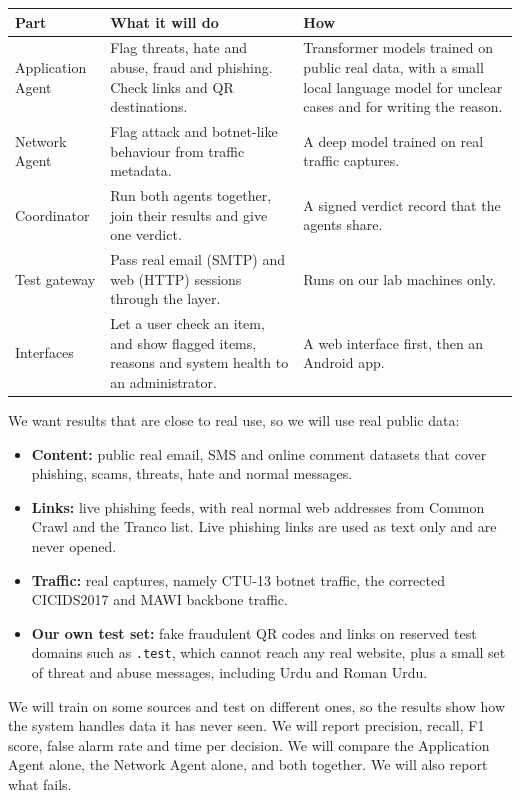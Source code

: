\documentclass[10.5pt,a4paper]{article}
\newcommand{\head}[1]{\vspace{5pt}{\large\bfseries #1}\par\vspace{1pt}}
\begin{document}
\head{3. What the prototype will include}
\begin{tabularx}{\linewidth}{@{}P{3cm}YP{5.6cm}@{}}
\toprule
\textbf{Part} & \textbf{What it will do} & \textbf{How} \\
\midrule
Application Agent & Flag threats, hate and abuse, fraud and phishing. Check links and QR destinations. & Transformer models trained on public real data, with a small local language model for unclear cases and for writing the reason. \\
Network Agent & Flag attack and botnet-like behaviour from traffic metadata. & A deep model trained on real traffic captures. \\
Coordinator & Run both agents together, join their results and give one verdict. & A signed verdict record that the agents share. \\
Test gateway & Pass real email (SMTP) and web (HTTP) sessions through the layer. & Runs on our lab machines only. \\
Interfaces & Let a user check an item, and show flagged items, reasons and system health to an administrator. & A web interface first, then an Android app. \\
\bottomrule
\end{tabularx}

\newpage
\head{4. Data and testing}
We want results that are close to real use, so we will use real public data:

\begin{itemize}
  \item \textbf{Content:} public real email, SMS and online comment datasets that cover phishing, scams, threats, hate and normal messages.
  \item \textbf{Links:} live phishing feeds, with real normal web addresses from Common Crawl and the Tranco list. Live phishing links are used as text only and are never opened.
  \item \textbf{Traffic:} real captures, namely CTU-13 botnet traffic, the corrected CICIDS2017 and MAWI backbone traffic.
  \item \textbf{Our own test set:} fake fraudulent QR codes and links on reserved test domains such as \texttt{.test}, which cannot reach any real website, plus a small set of threat and abuse messages, including Urdu and Roman Urdu.
\end{itemize}

We will train on some sources and test on different ones, so the results show how the system handles data it has never seen. We will report precision, recall, F1 score, false alarm rate and time per decision. We will compare the Application Agent alone, the Network Agent alone, and both together. We will also report what fails.
\end{document}
